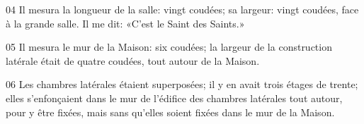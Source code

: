 
04 Il mesura la longueur de la salle: vingt coudées; sa largeur: vingt coudées, face à la grande salle. Il me dit: «C’est le Saint des Saints.»

05 Il mesura le mur de la Maison: six coudées; la largeur de la construction latérale était de quatre coudées, tout autour de la Maison.

06 Les chambres latérales étaient superposées; il y en avait trois étages de trente; elles s’enfonçaient dans le mur de l’édifice des chambres latérales tout autour, pour y être fixées, mais sans qu’elles soient fixées dans le mur de la Maison.
